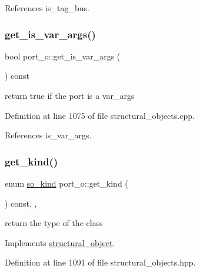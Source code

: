 References is\+\_\+tag\+\_\+bus.

\mbox{\label{structport__o_a91f3144e9d18e6e282e4dad12912d431}} 
\subsubsection{\texorpdfstring{get\+\_\+is\+\_\+var\+\_\+args()}{get\_is\_var\_args()}}
{\footnotesize\ttfamily bool port\+\_\+o\+::get\+\_\+is\+\_\+var\+\_\+args (\begin{DoxyParamCaption}{ }\end{DoxyParamCaption}) const}



return true if the port is a var\+\_\+args 



Definition at line 1075 of file structural\+\_\+objects.\+cpp.



References is\+\_\+var\+\_\+args.

\mbox{\label{structport__o_ab52b545359c3b6c24236f5328a49b3c5}} 
\subsubsection{\texorpdfstring{get\+\_\+kind()}{get\_kind()}}
{\footnotesize\ttfamily enum \hyperlink{structural__objects_8hpp_acf52399aecacb7952e414c5746ce6439}{so\+\_\+kind} port\+\_\+o\+::get\+\_\+kind (\begin{DoxyParamCaption}{ }\end{DoxyParamCaption}) const\hspace{0.3cm}{\ttfamily [inline]}, {\ttfamily [override]}, {\ttfamily [virtual]}}



return the type of the class 



Implements \hyperlink{classstructural__object_ad9f487c3b7774ecd4e2f55979c434cd0}{structural\+\_\+object}.



Definition at line 1091 of file structural\+\_\+objects.\+hpp.



